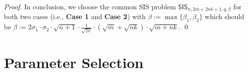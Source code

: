\documentclass[a4paper,11pt,onecolumn]{elsarticle}
\begin{document}
\begin{proof}
						 In conclusion, we choose the common SIS problem  $\mathsf{SIS}_{n, 2\overline{m}+2nk+1, q, \beta}$  for both two cases  (i.e., \textbf{Case 1} and \textbf{Case 2}) with $\beta:=\max \{\beta_1, \beta_2\}$ which should be  $ \beta:=  2\sigma_1\cdot \sigma_2\cdot \sqrt{n+1} \cdot \frac{1}{\sqrt{2\pi}}\cdot (\sqrt{\overline{m}}+\sqrt{nk}) \cdot\sqrt{m+nk}  $.
						 \qed
		\end{proof}
	
	
	\section{Parameter Selection} \label{para}
	
\end{document}
